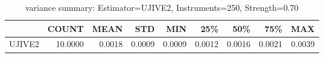 \begin{table}[ht]
\centering
\caption{variance summary: Estimator=UJIVE2, Instruments=250, Strength=0.70}
\begin{tabular}{lrrrrrrrr}
\toprule
 & COUNT & MEAN & STD & MIN & 25\% & 50\% & 75\% & MAX \\
\midrule
UJIVE2 & 10.0000 & 0.0018 & 0.0009 & 0.0009 & 0.0012 & 0.0016 & 0.0021 & 0.0039 \\
\bottomrule
\end{tabular}
\end{table}

